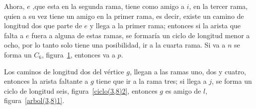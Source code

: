 \documentclass[12pt]{book}
\theoremstyle{definition}
\begin{document}
Ahora, $e$ ,que esta en la segunda rama, tiene como amigo a $i$, en la
tercer rama, quien a su vez tiene un amigo en la primer rama, es
decir, existe un camino de longitud dos que parte de $e$ y llega a la
primer rama; entonces si la arista que falta a $e$ fuera a alguna de
estas ramas, se formaría un ciclo de longitud menor a ocho, por lo
tanto solo tiene una posibilidad, ir a la cuarta rama. Si va a $n$ se
forma un $C_6$, figura~\ref{ciclo(3,8)1}, entonces va a $p$.


\begin{figure}
  \centering
  \caption{} \label{ciclo(3,8)1}
\end{figure}

Los caminos de longitud dos del vértice $g$, llegan a las ramas uno,
dos y cuatro, entonces la arista faltante a $g$ tiene que ir a la rama
tres; si llega a $j$, se forma un ciclo de longitud seis,
figura~\ref{ciclo(3,8)2}, entonces $g$ es amigo de $l$,
figura~\ref{arbol(3,8)1}.
\end{document}
